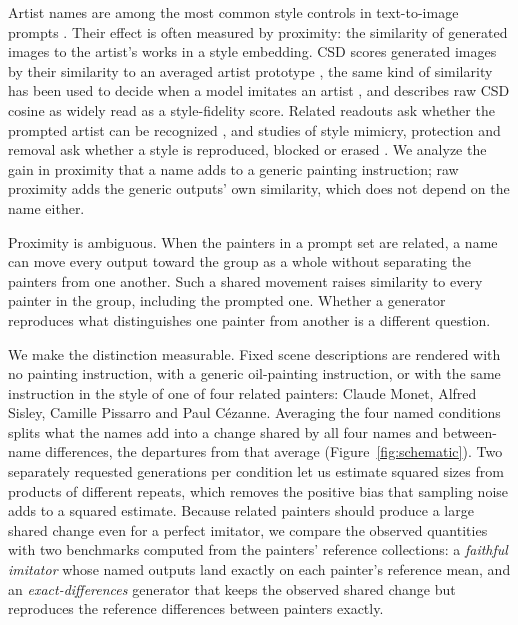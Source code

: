 \documentclass[10pt]{article}
\begin{document}
Artist names are among the most common style controls in text-to-image prompts
\citep{wang2023diffusiondb}. Their effect is often measured by proximity: the similarity of
generated images to the artist's works in a style embedding. CSD scores generated images by their
similarity to an averaged artist prototype \citep{somepalli2024style}, the same kind of similarity
has been used to decide when a model imitates an artist \citep{verma2025imitation}, and
\citet{frochte2026csd} describes raw CSD cosine as widely read as a style-fidelity score. Related
readouts ask whether the prompted artist can be recognized
\citep{casper2023measuring,su2025prompted,moayeri2025rethinking}, and studies of style mimicry,
protection and removal ask whether a style is reproduced, blocked or erased
\citep{shan2023glaze,honig2025adversarial,gandikota2023erasing,kumari2023ablating,zhang2024unlearncanvas}.
We analyze the gain in proximity that a name adds to a generic painting instruction; raw proximity
adds the generic outputs' own similarity, which does not depend on the name either.

Proximity is ambiguous. When the painters in a prompt set are related, a name can move every
output toward the group as a whole without separating the painters from one another. Such a shared
movement raises similarity to every painter in the group, including the prompted one. Whether a
generator reproduces what distinguishes one painter from another is a different question.

We make the distinction measurable. Fixed scene descriptions are rendered with no painting
instruction, with a generic oil-painting instruction, or with the same instruction in the style
of one of four related painters: Claude Monet, Alfred Sisley, Camille Pissarro and Paul
C\'ezanne. Averaging the four named conditions splits what the names add into a change shared
by all four names and between-name differences, the departures from that average
(Figure~\ref{fig:schematic}). Two separately requested generations per condition let us
estimate squared sizes from products of different repeats, which removes the positive bias that
sampling noise adds to a squared estimate. Because related painters should produce a large
shared change even for a perfect imitator, we compare the observed quantities with two
benchmarks computed from the painters' reference collections: a \emph{faithful imitator} whose
named outputs land exactly on each painter's reference mean, and an \emph{exact-differences}
generator that keeps the observed shared change but reproduces the reference differences
between painters exactly.
\end{document}
